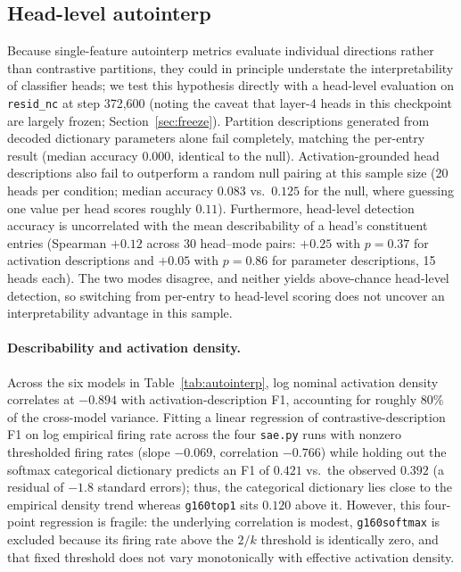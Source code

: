 \subsection{Head-level autointerp}
\label{sec:headautointerp}

Because single-feature autointerp metrics evaluate individual directions
rather than contrastive partitions, they could in principle understate the
interpretability of classifier heads; we test this hypothesis directly
with a head-level evaluation on \texttt{resid\_nc} at step 372{,}600
(noting the caveat that layer-4 heads in this checkpoint are largely
frozen; Section~\ref{sec:freeze}). Partition descriptions generated from
decoded dictionary parameters alone fail completely, matching the
per-entry result (median accuracy $0.000$, identical to the null).
Activation-grounded head descriptions also fail to outperform a random
null pairing at this sample size (20 heads per condition; median accuracy
$0.083$ vs.\ $0.125$ for the null, where guessing one value per head
scores roughly $0.11$). Furthermore, head-level detection accuracy is
uncorrelated with the mean describability of a head's constituent entries
(Spearman $+0.12$ across 30 head--mode pairs: $+0.25$ with $p{=}0.37$ for
activation descriptions and $+0.05$ with $p{=}0.86$ for parameter
descriptions, 15 heads each). The two modes disagree, and neither yields
above-chance head-level detection, so switching from per-entry to head-level scoring does not
uncover an interpretability advantage in this sample.

\paragraph{Describability and activation density.} Across the six models
in Table~\ref{tab:autointerp}, log nominal activation density correlates
at $-0.894$ with activation-description F1, accounting for roughly 80\% of
the cross-model variance. Fitting a linear regression of
contrastive-description F1 on log empirical firing rate across the four
\texttt{sae.py} runs with nonzero thresholded firing rates (slope
$-0.069$, correlation $-0.766$) while holding out the softmax categorical
dictionary predicts an F1 of $0.421$ vs.\ the observed $0.392$ (a residual
of $-1.8$ standard errors); thus, the categorical dictionary lies close to
the empirical density trend whereas \texttt{g160top1} sits $0.120$ above
it. However, this four-point regression is fragile: the underlying correlation is
modest, \texttt{g160softmax} is excluded because its firing rate above the
$2/k$ threshold is identically zero, and that fixed threshold does not
vary monotonically with effective activation density.

